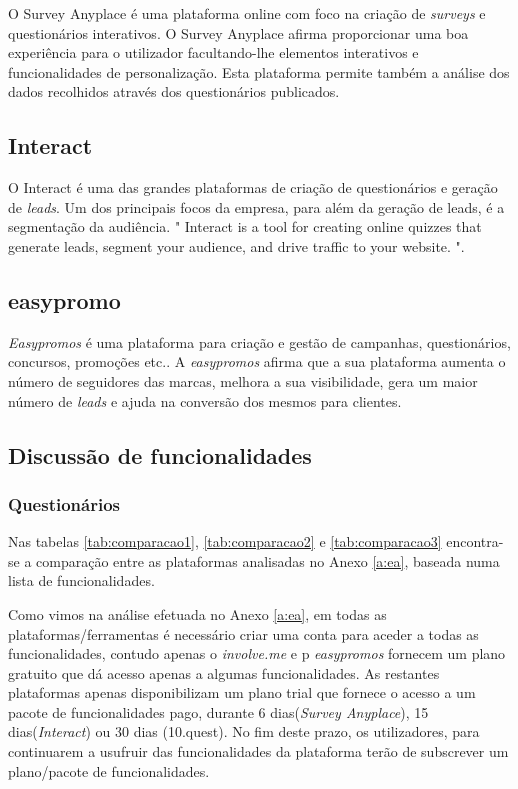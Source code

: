 

O Survey Anyplace é uma plataforma online com foco na criação de \textit{surveys} e questionários interativos. O Survey Anyplace afirma proporcionar uma boa experiência para o utilizador facultando-lhe elementos interativos e funcionalidades de personalização. Esta plataforma permite também a análise dos dados recolhidos através dos questionários publicados.


\subsection{Interact}
\label{interactM}


O Interact é uma das grandes plataformas de criação de questionários e geração de \textit{leads}. Um dos principais focos da empresa, para além da geração de leads, é a segmentação da audiência. " Interact is a tool for creating online quizzes that generate leads, segment your audience, and drive traffic to your website. "\cite{interact}.



\subsection{easypromo}
\label{easypromoM}

\textit{Easypromos}\cite{f6} é uma plataforma para criação e gestão de campanhas, questionários, concursos, promoções etc.. A \textit{easypromos} afirma que a sua plataforma aumenta o número de seguidores das marcas, melhora a sua visibilidade, gera um maior número de \textit{leads} e ajuda na conversão dos mesmos para clientes.


\subsection{Discussão de funcionalidades}
\label{comparacao}

\subsubsection{Questionários}

Nas tabelas \ref{tab:comparacao1}, \ref{tab:comparacao2} e \ref{tab:comparacao3} encontra-se a comparação entre as plataformas analisadas no Anexo \ref{a:ea}, baseada numa lista de funcionalidades.

Como vimos na análise efetuada no Anexo \ref{a:ea}, em todas as plataformas/ferramentas é necessário criar uma conta para aceder a todas as funcionalidades, contudo apenas o \textit{involve.me} e p \textit{easypromos} fornecem um plano gratuito que dá acesso apenas a algumas funcionalidades. As restantes plataformas apenas disponibilizam um plano trial que fornece o acesso a um pacote de funcionalidades pago, durante 6 dias(\textit{Survey Anyplace}), 15 dias(\textit{Interact}) ou 30 dias (10.quest). No fim deste prazo, os utilizadores, para continuarem a usufruir das funcionalidades da plataforma terão de subscrever um plano/pacote de funcionalidades.

